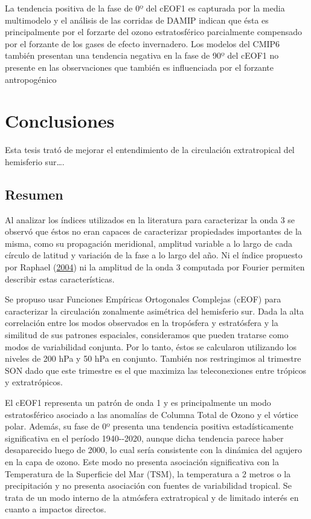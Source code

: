 \documentclass[12pt,oneside,a4paper]{reedthesis}
\begin{document}
La tendencia positiva de la fase de 0º del cEOF1 es capturada por la media multimodelo y el análisis de las corridas de DAMIP indican que ésta es principalmente por el forzarte del ozono estratosférico parcialmente compensado por el forzante de los gases de efecto invernadero.
Los modelos del CMIP6 también presentan una tendencia negativa en la fase de 90º del cEOF1 no presente en las observaciones que también es influenciada por el forzante antropogénico

\hypertarget{conclusiones-3}{%
\chapter{Conclusiones}\label{conclusiones-3}}

Esta tesis trató de mejorar el entendimiento de la circulación extratropical del hemisferio sur\ldots.

\hypertarget{resumen-1}{%
\section{Resumen}\label{resumen-1}}

Al analizar los índices utilizados en la literatura para caracterizar la onda 3 se observó que éstos no eran capaces de caracterizar propiedades importantes de la misma, como su propagación meridional, amplitud variable a lo largo de cada círculo de latitud y variación de la fase a lo largo del año.
Ni el índice propuesto por Raphael (\protect\hyperlink{ref-raphael2004}{2004}) ni la amplitud de la onda 3 computada por Fourier permiten describir estas características.

Se propuso usar Funciones Empíricas Ortogonales Complejas (cEOF) para caracterizar la circulación zonalmente asimétrica del hemisferio sur.
Dada la alta correlación entre los modos observados en la tropósfera y estratósfera y la similitud de sus patrones espaciales, consideramos que pueden tratarse como modos de variabilidad conjunta.
Por lo tanto, éstos se calcularon utilizando los niveles de 200 hPa y 50 hPa en conjunto.
También nos restringimos al trimestre SON dado que este trimestre es el que maximiza las teleconexiones entre trópicos y extratrópicos.

El cEOF1 representa un patrón de onda 1 y es principalmente un modo estratosférico asociado a las anomalías de Columna Total de Ozono y el vórtice polar.
Además, su fase de 0º presenta una tendencia positiva estadísticamente significativa en el período 1940-\/-2020, aunque dicha tendencia parece haber desaparecido luego de 2000, lo cual sería consistente con la dinámica del agujero en la capa de ozono.
Este modo no presenta asociación significativa con la Temperatura de la Superficie del Mar (TSM), la temperatura a 2 metros o la precipitación y no presenta asociación con fuentes de variabilidad tropical.
Se trata de un modo interno de la atmósfera extratropical y de limitado interés en cuanto a impactos directos.
\end{document}
